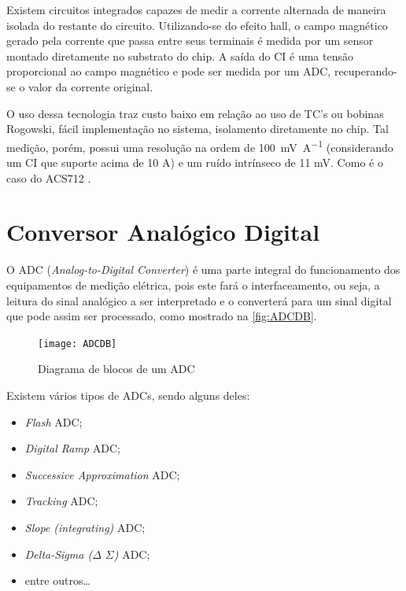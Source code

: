 Existem circuitos integrados capazes de medir a corrente alternada de maneira isolada do restante do circuito. Utilizando-se do efeito hall, o campo magnético gerado pela corrente que passa entre seus terminais é medida por um sensor montado diretamente no substrato do chip. A saída do CI é uma tensão proporcional ao campo magnético e pode ser medida por um ADC, recuperando-se o valor da corrente original.

O uso dessa tecnologia traz custo baixo em relação ao uso de TC's ou bobinas Rogowski, fácil implementação no sistema, isolamento diretamente no chip. Tal medição, porém, possui uma resolução na ordem de \SI{100}{\milli\volt\per\ampere} (considerando um CI que suporte acima de 10 A) e um ruído intrínseco de 11 mV. Como é o caso do ACS712 \citep{acs712}.

\section{Conversor Analógico Digital}\label{sec:ADC}

O \gls{ADC} (\textit{Analog-to-Digital Converter}) é uma parte integral do funcionamento dos equipamentos de medição elétrica, pois este fará o interfaceamento, ou seja, a leitura do sinal analógico a ser interpretado e o converterá para um sinal digital que pode assim ser processado, como mostrado na \autoref{fig:ADCDB}.

\begin{figure}[htb!]%
    \caption{Diagrama de blocos de um ADC}%
    \label{fig:ADCDB}%
    \texttt{[image: ADCDB]}%
\end{figure}

Existem vários tipos de \gls{ADC}s, sendo alguns deles:

\begin{itemize}
    \item \textit{Flash} \gls{ADC};
    \item \textit{Digital Ramp} \gls{ADC};
    \item \textit{Successive Approximation} \gls{ADC};
    \item \textit{Tracking} \gls{ADC};
    \item \textit{Slope (integrating)} \gls{ADC};
    \item \textit{Delta-Sigma ($\Delta$ $\Sigma$)} \gls{ADC};
    \item entre outros\dots
\end{itemize}

